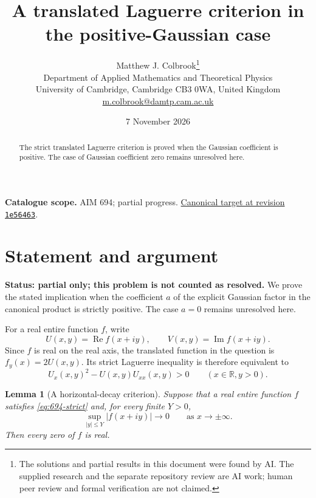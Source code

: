 \documentclass[11pt,a4paper]{article}
\newtheorem{lemma}[theorem]{Lemma}
\theoremstyle{remark}
\begin{document}
\title{A translated Laguerre criterion in the positive-Gaussian case}
\author{Matthew J. Colbrook\thanks{The solutions and partial results in this document were found by AI. The supplied research and the separate repository review are AI work; human peer review and formal verification are not claimed.}\\[4pt]
\small Department of Applied Mathematics and Theoretical Physics\\
\small University of Cambridge, Cambridge CB3 0WA, United Kingdom\\
\small\href{mailto:m.colbrook@damtp.cam.ac.uk}{m.colbrook@damtp.cam.ac.uk}}
\date{7 November 2026}
\maketitle
\begin{abstract}
The strict translated Laguerre criterion is proved when the Gaussian coefficient is positive. The case of Gaussian coefficient zero remains unresolved here.
\end{abstract}
\noindent\textbf{Catalogue scope.} AIM 694; partial progress. \href{https://github.com/MColbrook/AIM/blob/1e564633494c109edfd3ec46da1366adcff925a5/problems/694-does-a-strict-laguerre-inequality-for-every-imaginary-translate-force-real-zeros.md}{Canonical target at revision \texttt{1e56463}}.


\section{Statement and argument}
\label{sec:694partial}

\textbf{Status: partial only; this problem is not counted as resolved.}
We prove the stated implication when the coefficient $a$ of the explicit
Gaussian factor in the canonical product is strictly positive.  The case
$a=0$ remains unresolved here.

For a real entire function $f$, write
\[
 U(x,y)=\operatorname{Re}f(x+iy),\qquad
 V(x,y)=\operatorname{Im}f(x+iy).
\]
Since $f$ is real on the real axis, the translated function in the
question is $f_y(x)=2U(x,y)$.  Its strict Laguerre inequality is therefore
equivalent to
\begin{equation}
 U_x(x,y)^2-U(x,y)U_{xx}(x,y)>0
 \qquad(x\in\mathbb R, y>0).
 \label{eq:694-strict}
\end{equation}

\begin{lemma}[A horizontal-decay criterion]
Suppose that a real entire function $f$ satisfies
\eqref{eq:694-strict} and, for every finite $Y>0$,
\begin{equation}
 \sup_{|y|\le Y}|f(x+iy)|\longrightarrow0
 \qquad\text{as }x\longrightarrow\pm\infty.
 \label{eq:694-decay}
\end{equation}
Then every zero of $f$ is real.
\end{lemma}
\end{document}
